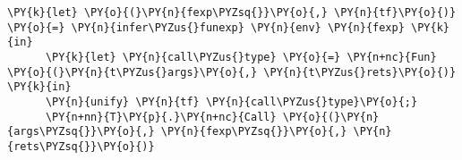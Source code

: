 \begin{Verbatim}[commandchars=\\\{\}]
      \PY{k}{let} \PY{o}{(}\PY{n}{fexp\PYZsq{}}\PY{o}{,} \PY{n}{tf}\PY{o}{)} \PY{o}{=} \PY{n}{infer\PYZus{}funexp} \PY{n}{env} \PY{n}{fexp} \PY{k}{in}
      \PY{k}{let} \PY{n}{call\PYZus{}type} \PY{o}{=} \PY{n+nc}{Fun} \PY{o}{(}\PY{n}{t\PYZus{}args}\PY{o}{,} \PY{n}{t\PYZus{}rets}\PY{o}{)} \PY{k}{in}
      \PY{n}{unify} \PY{n}{tf} \PY{n}{call\PYZus{}type}\PY{o}{;}
      \PY{n+nn}{T}\PY{p}{.}\PY{n+nc}{Call} \PY{o}{(}\PY{n}{args\PYZsq{}}\PY{o}{,} \PY{n}{fexp\PYZsq{}}\PY{o}{,} \PY{n}{rets\PYZsq{}}\PY{o}{)}
\end{Verbatim}
